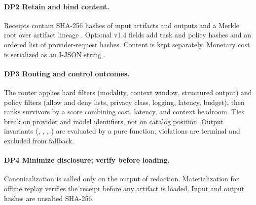 \paragraph{DP2 Retain and bind content.} Receipts contain SHA-256 hashes of input artifacts and outputs and a Merkle root over artifact lineage \citep{merkle1988}. Optional v1.4 fields add task and policy hashes and an ordered list of provider-request hashes. Content is kept separately. Monetary cost is serialized as an I-JSON string \citep{rfc7493}.

\paragraph{DP3 Routing and control outcomes.} The router applies hard filters (modality, context window, structured output) and policy filters (allow and deny lists, privacy class, logging, latency, budget), then ranks survivors by a score combining cost, latency, and context headroom. Ties break on provider and model identifiers, not on catalog position. Output invariants (, , , ) are evaluated by a pure function; violations are terminal and excluded from fallback.

\paragraph{DP4 Minimize disclosure; verify before loading.} Canonicalization is called only on the output of redaction. Materialization for offline replay verifies the receipt before any artifact is loaded. Input and output hashes are unsalted SHA-256.

